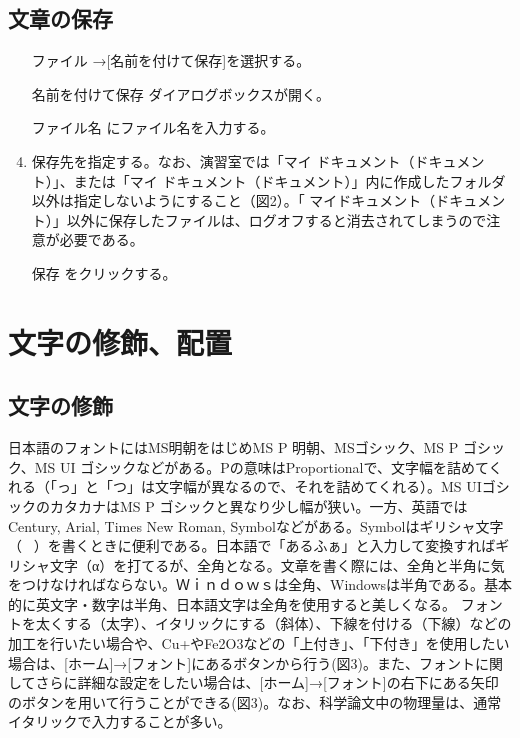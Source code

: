 \subsection{文章の保存}
\begin{enumerate}
\item [ファイル]→[名前を付けて保存]を選択する。
\item [名前を付けて保存]ダイアログボックスが開く。
\item [ファイル名]にファイル名を入力する。
\item 保存先を指定する。なお、演習室では「マイ ドキュメント（ドキュメント）」、または「マイ ドキュメント（ドキュメント）」内に作成したフォルダ以外は指定しないようにすること（図2）。「
マイドキュメント（ドキュメント）」以外に保存したファイルは、ログオフすると消去されてしまうので注意が必要である。
\item [保存]をクリックする。
\end{enumerate}

\section{文字の修飾、配置}
\subsection{文字の修飾}
日本語のフォントにはMS明朝をはじめMS P 明朝、MSゴシック、MS P ゴシック、MS UI ゴシックなどがある。Pの意味はProportionalで、文字幅を詰めてくれる（「っ」と「つ」は文字幅が異なるので、それを詰めてくれる）。MS UIゴシックのカタカナはMS P ゴシックと異なり少し幅が狭い。一方、英語ではCentury, Arial, Times New Roman, Symbolなどがある。Symbolはギリシャ文字（）を書くときに便利である。日本語で「あるふぁ」と入力して変換すればギリシャ文字（α）を打てるが、全角となる。文章を書く際には、全角と半角に気をつけなければならない。Ｗｉｎｄｏｗｓは全角、Windowsは半角である。基本的に英文字・数字は半角、日本語文字は全角を使用すると美しくなる。
フォントを太くする（太字）、イタリックにする（斜体）、下線を付ける（下線）などの加工を行いたい場合や、Cu+やFe2O3などの「上付き」、「下付き」を使用したい場合は、[ホーム]→[フォント]にあるボタンから行う(図3)。また、フォントに関してさらに詳細な設定をしたい場合は、[ホーム]→[フォント]の右下にある矢印のボタンを用いて行うことができる(図3)。なお、科学論文中の物理量は、通常イタリックで入力することが多い。


